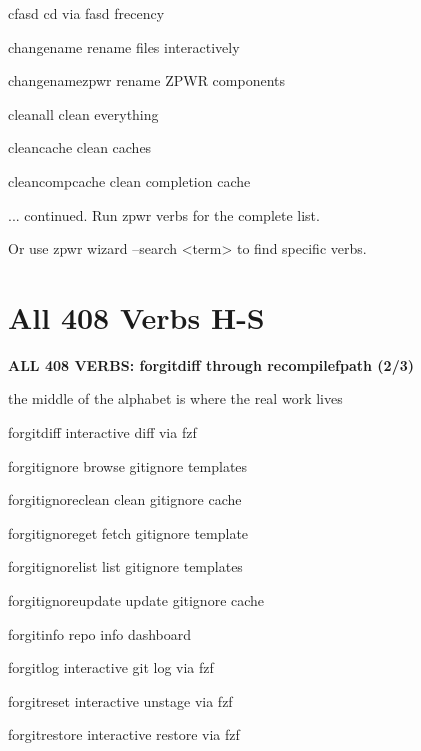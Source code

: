 \documentclass[11pt,a4paper,twoside]{book}
\begin{document}
cfasd                      cd via fasd frecency

changename                 rename files interactively

\begin{codebox}
changenamezpwr             rename ZPWR components\\
\end{codebox}

cleanall                   clean everything

cleancache                 clean caches

cleancompcache             clean completion cache

... continued. Run zpwr verbs for the complete list.

Or use zpwr wizard --search <term> to find specific verbs.


\vspace{16pt}

\section{All 408 Verbs H-S}


\vspace{10pt}
{\large\bfseries\color{neoncyan} ALL 408 VERBS: forgitdiff through recompilefpath (2/3)}\vspace{6pt}

the middle of the alphabet is where the real work lives

forgitdiff                 interactive diff via fzf

forgitignore               browse gitignore templates

forgitignoreclean          clean gitignore cache

forgitignoreget            fetch gitignore template

forgitignorelist           list gitignore templates

forgitignoreupdate         update gitignore cache

forgitinfo                 repo info dashboard

\begin{codebox}
forgitlog                  interactive git log via fzf\\
\end{codebox}

forgitreset                interactive unstage via fzf

forgitrestore              interactive restore via fzf
\end{document}
